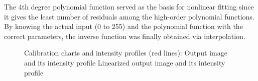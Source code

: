 The 4th degree polynomial function served as the basis for nonlinear fitting since it gives the least number of residuals among the high-order polynomial functions. 
By knowing the actual input (0 to 255) and the polynomial function with the correct parameters, the inverse function was finally obtained via interpolation.
\captionsetup[figure]{width=5in}
\begin{figure}[h!t]
	\centering
	\caption{Calibration charts and intensity profiles (red lines):  Output image and
		 its intensity profile
		 Linearized output image and 
		 its intensity profile}
	\label{fig:calib}
\end{figure}

